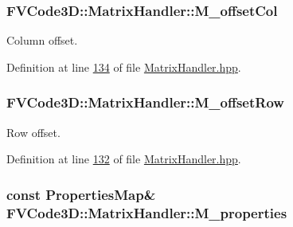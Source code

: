 \subsubsection[{\texorpdfstring{M\+\_\+offset\+Col}{M_offsetCol}}]{ F\+V\+Code3\+D\+::\+Matrix\+Handler\+::\+M\+\_\+offset\+Col\hspace{0.3cm}{\ttfamily [protected]}}\hypertarget{classFVCode3D_1_1MatrixHandler_a6ec7cf5178c1c25b54abc46ff0affcf2}{}\label{classFVCode3D_1_1MatrixHandler_a6ec7cf5178c1c25b54abc46ff0affcf2}


Column offset. 



Definition at line \hyperlink{MatrixHandler_8hpp_source_l00134}{134} of file \hyperlink{MatrixHandler_8hpp_source}{Matrix\+Handler.\+hpp}.

\subsubsection[{\texorpdfstring{M\+\_\+offset\+Row}{M_offsetRow}}]{ F\+V\+Code3\+D\+::\+Matrix\+Handler\+::\+M\+\_\+offset\+Row\hspace{0.3cm}{\ttfamily [protected]}}\hypertarget{classFVCode3D_1_1MatrixHandler_ad3faa8b15bca6e0052be8c868b924444}{}\label{classFVCode3D_1_1MatrixHandler_ad3faa8b15bca6e0052be8c868b924444}


Row offset. 



Definition at line \hyperlink{MatrixHandler_8hpp_source_l00132}{132} of file \hyperlink{MatrixHandler_8hpp_source}{Matrix\+Handler.\+hpp}.

\subsubsection[{\texorpdfstring{M\+\_\+properties}{M_properties}}]{\setlength{\rightskip}{0pt plus 5cm}const {\bf Properties\+Map}\& F\+V\+Code3\+D\+::\+Matrix\+Handler\+::\+M\+\_\+properties\hspace{0.3cm}{\ttfamily [protected]}}\hypertarget{classFVCode3D_1_1MatrixHandler_ad17a7941b1b8272f50fc6e1c660103fa}{}\label{classFVCode3D_1_1MatrixHandler_ad17a7941b1b8272f50fc6e1c660103fa}


